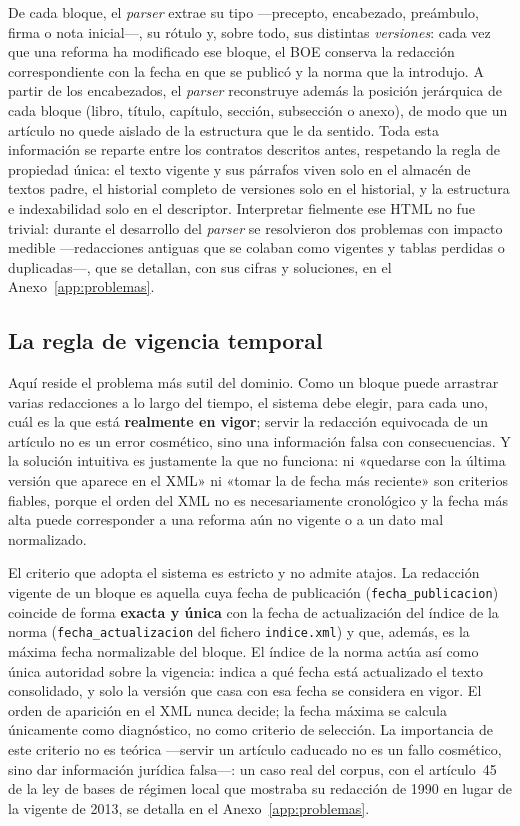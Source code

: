 De cada bloque, el \emph{parser} extrae su tipo —precepto, encabezado, preámbulo, firma o nota inicial—, su rótulo y, sobre todo, sus distintas \emph{versiones}: cada vez que una reforma ha modificado ese bloque, el BOE conserva la redacción correspondiente con la fecha en que se publicó y la norma que la introdujo. A partir de los encabezados, el \emph{parser} reconstruye además la posición jerárquica de cada bloque (libro, título, capítulo, sección, subsección o anexo), de modo que un artículo no quede aislado de la estructura que le da sentido. Toda esta información se reparte entre los contratos descritos antes, respetando la regla de propiedad única: el texto vigente y sus párrafos viven solo en el almacén de textos padre, el historial completo de versiones solo en el historial, y la estructura e indexabilidad solo en el descriptor. Interpretar fielmente ese HTML no fue trivial: durante el desarrollo del \emph{parser} se resolvieron dos problemas con impacto medible —redacciones antiguas que se colaban como vigentes y tablas perdidas o duplicadas—, que se detallan, con sus cifras y soluciones, en el Anexo~\ref{app:problemas}.

\subsection{La regla de vigencia temporal}
\label{subsec:vigencia}

Aquí reside el problema más sutil del dominio. Como un bloque puede arrastrar varias redacciones a lo largo del tiempo, el sistema debe elegir, para cada uno, cuál es la que está \textbf{realmente en vigor}; servir la redacción equivocada de un artículo no es un error cosmético, sino una información falsa con consecuencias. Y la solución intuitiva es justamente la que no funciona: ni «quedarse con la última versión que aparece en el XML» ni «tomar la de fecha más reciente» son criterios fiables, porque el orden del XML no es necesariamente cronológico y la fecha más alta puede corresponder a una reforma aún no vigente o a un dato mal normalizado.

El criterio que adopta el sistema es estricto y no admite atajos. La redacción vigente de un bloque es aquella cuya fecha de publicación (\texttt{fecha\_publicacion}) coincide de forma \textbf{exacta y única} con la fecha de actualización del índice de la norma (\texttt{fecha\_actualizacion} del fichero \texttt{indice.xml}) y que, además, es la máxima fecha normalizable del bloque. El índice de la norma actúa así como única autoridad sobre la vigencia: indica a qué fecha está actualizado el texto consolidado, y solo la versión que casa con esa fecha se considera en vigor. El orden de aparición en el XML nunca decide; la fecha máxima se calcula únicamente como diagnóstico, no como criterio de selección. La importancia de este criterio no es teórica —servir un artículo caducado no es un fallo cosmético, sino dar información jurídica falsa—: un caso real del corpus, con el artículo~45 de la ley de bases de régimen local que mostraba su redacción de 1990 en lugar de la vigente de 2013, se detalla en el Anexo~\ref{app:problemas}.

